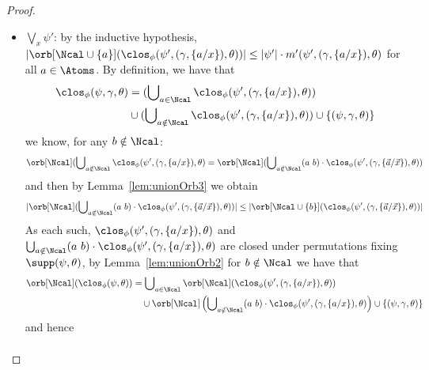 \begin{proof}
\begin{enumerate}
\begin{itemize}
\begin{align*}
				\\&\le |\psi|\cdot m'(\psi)
			\end{align*}
			A similar argument can be shown for $\sq{\ell}\psi'$.
			\item $\bigvee_x \psi'$: by the inductive hypothesis, $|\orb[\Ncal \cup \{a\}](\clos_\phi(\psi',(\gamma, \{a/x\}), \theta))| \le |\psi'|\cdot m'(\psi',(\gamma, \{a/x\}),\theta)$ for all $a \in \Atoms$.
			By definition, we have that 
			\begin{align*}
				\clos_\phi(\psi,\gamma, \theta) &= (\bigcup\nolimits_{a \in \Ncal} \clos_\phi(\psi',(\gamma, \{a/x\}), \theta))\\ &\cup (\bigcup\nolimits_{a \notin \Ncal} \clos_\phi(\psi',(\gamma, \{a/x\}), \theta)) \cup \{(\psi,\gamma, \theta)\}
			\end{align*}
			we know, for any $b \notin \Ncal$:
			\[
			\orb[\Ncal](\bigcup\nolimits_{a \notin \Ncal} \clos_\phi(\psi',(\gamma, \{a/x\}), \theta) = \orb[\Ncal](\bigcup\nolimits_{a \notin \Ncal} (a\ b) \cdot \clos_\phi(\psi',(\gamma, \{\vec a / \vec x\}), \theta))
			\]
			and then by Lemma~\ref{lem:unionOrb3} we obtain 
			\[
			|\orb[\Ncal](\bigcup\nolimits_{a \notin \Ncal} (a\ b) \cdot \clos_\phi(\psi',(\gamma, \{\vec a / \vec x\}), \theta))| \le |\orb[\Ncal \cup \{b\}](\clos_\phi(\psi',(\gamma, \{\vec a / \vec x\}), \theta))|
			\]
			As each such, $\clos_\phi(\psi',(\gamma, \{a/x\}), \theta)$ and $\bigcup\nolimits_{a \notin \Ncal} (a\ b) \cdot\clos_\phi(\psi',(\gamma, \{ a /  x\}), \theta)$ are closed under permutations fixing $\supp(\psi,\theta)$, by Lemma~\ref{lem:unionOrb2} for $b \notin \Ncal$ we have that 
			\begin{align*}
				\orb[\Ncal](\clos_\phi(\psi, \theta)) 
				&= \bigcup\nolimits_{a \in \Ncal} \orb[\Ncal](\clos_\phi(\psi',(\gamma, \{a/x\}), \theta)) 
				\\
				&\quad\cup \orb[\Ncal]\left(\bigcup\nolimits_{a \notin \Ncal} (a\ b) \cdot\clos_\phi(\psi',(\gamma, \{a/x\}), \theta)\right)
				\cup\{(\psi, \gamma,\theta)\} 
			\end{align*}
			and hence
			\begin{align*}

\end{align*}
\end{itemize}
\end{enumerate}
\end{proof}

